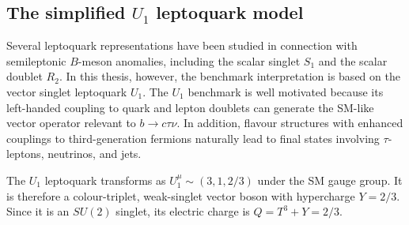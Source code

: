 

\subsection{The simplified $U_{1}$ leptoquark model}
\label{subsec:u1_simplified_model}

Several leptoquark representations have been studied in connection with semileptonic $B$-meson anomalies, including the scalar singlet $S_{1}$ and the scalar doublet $R_{2}$. 
In this thesis, however, the benchmark interpretation is based on the vector singlet leptoquark $U_{1}$. 
The $U_{1}$ benchmark is well motivated because its left-handed coupling to quark and lepton doublets can generate the SM-like vector operator relevant to $b\rightarrow c\tau\nu$. 
In addition, flavour structures with enhanced couplings to third-generation fermions naturally lead to final states involving $\tau$-leptons, neutrinos, and jets.

The $U_{1}$ leptoquark transforms as
$U_{1}^{\mu}\sim(3,1,2/3)$
under the SM gauge group.
It is therefore a colour-triplet, weak-singlet vector boson with hypercharge $Y=2/3$. 
Since it is an $SU(2)$ singlet, its electric charge is $Q=T^{3}+Y=2/3$.

